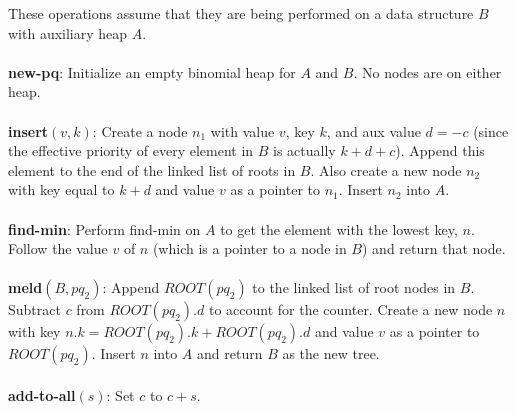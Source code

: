 \documentclass{article}
\theoremstyle{casestyle}
\begin{document}
These operations assume that they are being performed on a data structure $B$ with auxiliary heap $A$.\\\\
\textbf{new-pq}: Initialize an empty binomial heap for $A$ and $B$. No nodes are on either heap. \\\\
\textbf{insert}$(v,k)$: Create a node $n_1$ with value $v$, key $k$, and aux value $d=-c$ (since the effective priority of every element in $B$ is actually $k+d+c$). Append this element to the end of the linked list of roots in $B$. Also create a new node $n_2$ with key equal to $k+d$ and value $v$ as a pointer to $n_1$. Insert $n_2$ into $A$.\\\\
\textbf{find-min}: Perform find-min on $A$ to get the element with the lowest key, $n$. Follow the value $v$ of $n$ (which is a pointer to a node in $B$) and return that node.\\\\
\textbf{meld}$(B,pq_2)$: Append $ROOT(pq_2)$ to the linked list of root nodes in $B$. Subtract $c$ from $ROOT(pq_2).d$ to account for the counter. Create a new node $n$ with key $n.k=ROOT(pq_2).k+ROOT(pq_2).d$ and value $v$ as a pointer to $ROOT(pq_2)$. Insert $n$ into $A$ and return $B$ as the new tree.\\\\
\textbf{add-to-all}$(s)$: Set $c$ to $c + s$.  \\\\
\end{document}
